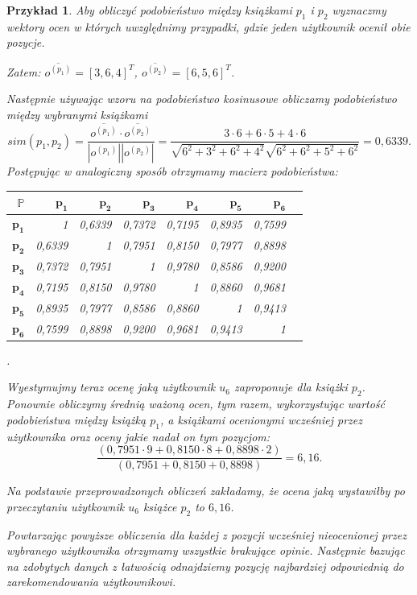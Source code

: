 \documentclass[12pt,a4paper]{report}
\newtheorem{przyklad}{Przykład}[chapter]{\normalfont}
\begin{document}
\begin{przyklad}
Aby obliczyć podobieństwo między książkami $p_1$ i $p_2$ wyznaczmy wektory ocen w których uwzględnimy przypadki, gdzie jeden użytkownik ocenił obie pozycje.

Zatem: $\overline{o^{(p_1)}} = [3, 6, 4]^T$, $\overline{o^{(p_2)}} =[6, 5, 6]^T$.

Następnie używając wzoru na podobieństwo kosinusowe obliczamy podobieństwo między wybranymi książkami
$$
sim(p_1,p_2) = \frac{\overline{o^{(p_1)}} \cdot \overline{o^{(p_2)}}}{|o^{(p_1)}||o^{(p_2)}|} = \frac{3 \cdot 6 + 6 \cdot 5 + 4 \cdot 6}{\sqrt{6^2 + 3^2 + 6^2 + 4^2} \sqrt{6^2 + 6^2 + 5^2 + 6^2}} = 0,6339.
$$
Postępując w analogiczny sposób otrzymamy macierz podobieństwa:
\begin{center}
\begin{tabular}{|r|r|r|r|r|r|r|r|} \hline
$\mathbb{P}$ & $\mathbf{p_1}$ & $\mathbf{p_2}$ & $\mathbf{p_3}$ & $\mathbf{p_4}$ & $\mathbf{p_5}$ & $\mathbf{p_6}$ \\
\hline
$\mathbf{p_1}$ & 1 & 0,6339 & 0,7372 & 0,7195 & 0,8935 & 0,7599 \\
\hline
$\mathbf{p_2}$ & 0,6339 & 1 & 0,7951 & 0,8150 & 0,7977 & 0,8898 \\
\hline
$\mathbf{p_3}$ & 0,7372 & 0,7951 & 1 & 0,9780 & 0,8586 & 0,9200 \\
\hline
$\mathbf{p_4}$ & 0,7195 & 0,8150 & 0,9780 & 1 & 0,8860 & 0,9681 \\
\hline 
$\mathbf{p_5}$ & 0,8935 & 0,7977 & 0,8586 & 0,8860 & 1 & 0,9413 \\
\hline 
$\mathbf{p_6}$ & 0,7599 & 0,8898 & 0,9200 & 0,9681 & 0,9413 & 1 \\
\hline 
\end{tabular}.
\end{center}
Wyestymujmy teraz ocenę jaką użytkownik $u_6$ zaproponuje dla książki $p_2$. Ponownie obliczymy średnią ważoną ocen, tym razem, wykorzystując wartość podobieństwa między książką $p_1$, a książkami ocenionymi wcześniej przez użytkownika oraz oceny jakie nadał on tym pozycjom:
$$
\frac{(0,7951 \cdot 9 + 0,8150 \cdot 8 + 0,8898 \cdot 2)}{(0,7951 + 0,8150 + 0,8898)} = 6,16.
$$

Na podstawie przeprowadzonych obliczeń zakładamy, że ocena jaką wystawiłby po przeczytaniu użytkownik $u_6$ książce $p_2$ to $6,16$.

Powtarzając powyższe obliczenia dla każdej z pozycji wcześniej nieocenionej przez wybranego użytkownika otrzymamy wszystkie brakujące opinie. Następnie bazując na zdobytych danych z łatwością odnajdziemy pozycję najbardziej odpowiednią do zarekomendowania użytkownikowi.
\end{przyklad}
\end{document}

